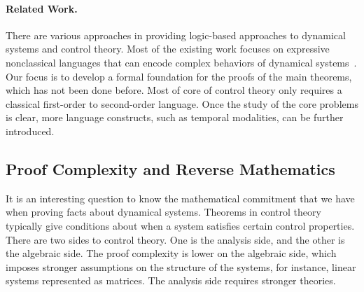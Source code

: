 \documentclass[10pt]{article}
\theoremstyle{definition}
\begin{document}
\paragraph{Related Work. } There are various approaches in providing logic-based approaches to dynamical systems and control theory. Most of the existing work focuses on expressive nonclassical languages that can encode complex behaviors of dynamical systems~\cite{DBLP:conf/lics/Platzer12}. Our focus is to develop a formal foundation for the proofs of the main theorems, which has not been done before. Most of core of control theory only requires a classical first-order to second-order language. Once the study of the core problems is clear, more language constructs, such as temporal modalities, can be further introduced. 

\subsection{Proof Complexity and Reverse Mathematics} 

It is an interesting question to know the mathematical commitment that we have when proving facts about dynamical systems. Theorems in control theory typically give conditions about when a system satisfies certain control properties. There are two sides to control theory. One is the analysis side, and the other is the algebraic side. The proof complexity is lower on the algebraic side, which imposes stronger assumptions on the structure of the systems, for instance, linear systems represented as matrices. The analysis side requires stronger theories. 
\end{document}
